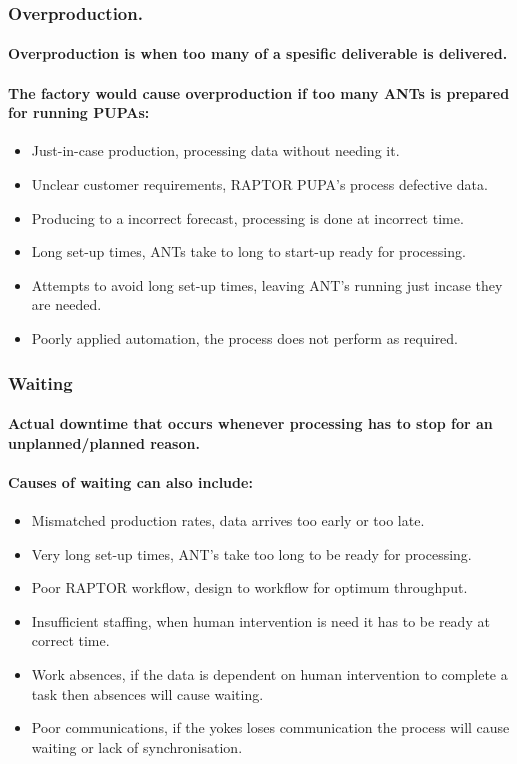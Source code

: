 \subsubsection{Overproduction.}
\paragraph{Overproduction is when too many of a spesific deliverable is delivered.}
\paragraph{The factory would cause overproduction if too many ANTs is prepared for running PUPAs:}
\begin{itemize}
\item Just-in-case production, processing data without needing it.
\item Unclear customer requirements, RAPTOR PUPA's process defective data.
\item Producing to a incorrect forecast, processing is done at incorrect time.
\item Long set-up times, ANTs take to long to start-up ready for processing.
\item Attempts to avoid long set-up times, leaving ANT's running just incase they are needed.
\item Poorly applied automation, the process does not perform as required. 
\end{itemize}
\subsubsection{Waiting}
\paragraph{Actual downtime that occurs whenever processing has to stop for an unplanned/planned reason.}
\paragraph{Causes of waiting can also include:}
\begin{itemize}
\item Mismatched production rates, data arrives too early or too late.
\item Very long set-up times, ANT's take too long to be ready for processing.
\item Poor RAPTOR workflow, design to workflow for optimum throughput.
\item Insufficient staffing, when human intervention is need it has to be ready at correct time.
\item Work absences, if the data is dependent on human intervention to complete a task then absences will cause waiting.
\item Poor communications, if the yokes loses communication the process will cause waiting or lack of synchronisation.
\end{itemize}
